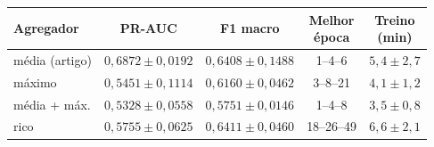 \begin{tabular}{lcccc}
\toprule
Agregador & PR-AUC & F1 macro & \makecell{Melhor\\época} & \makecell{Treino\\(min)} \\
\midrule
média (artigo) & $0,6872 \pm 0,0192$ & $0,6408 \pm 0,1488$ & 1--4--6 & $5,4 \pm 2,7$ \\
máximo & $0,5451 \pm 0,1114$ & $0,6160 \pm 0,0462$ & 3--8--21 & $4,1 \pm 1,2$ \\
média + máx. & $0,5328 \pm 0,0558$ & $0,5751 \pm 0,0146$ & 1--4--8 & $3,5 \pm 0,8$ \\
rico & $0,5755 \pm 0,0625$ & $0,6411 \pm 0,0460$ & 18--26--49 & $6,6 \pm 2,1$ \\
\bottomrule
\end{tabular}
